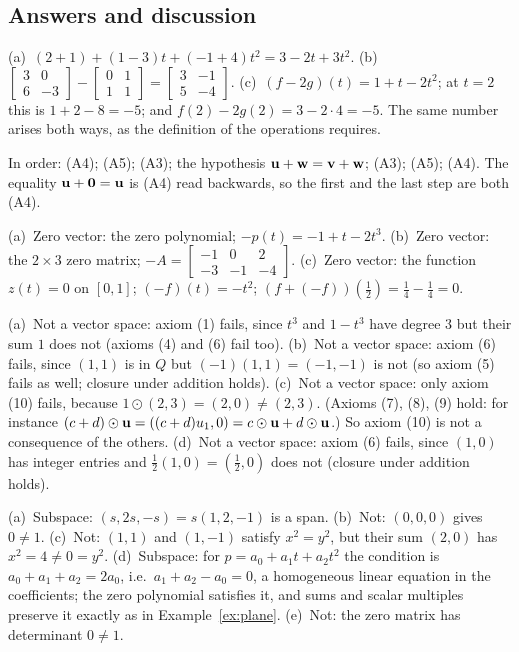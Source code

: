 \documentclass[11pt]{article}
\begin{document}
\subsection*{Answers and discussion}
\begin{description}[leftmargin=0pt,itemsep=5pt]
  \item[Knowledge Check \ref{kc:newworlds}.] (a)~$(2+1)+(1-3)t+(-1+4)t^2=3-2t+3t^2$. (b)~$\begin{bmatrix}3&0\\6&-3\end{bmatrix}-\begin{bmatrix}0&1\\1&1\end{bmatrix}=\begin{bmatrix}3&-1\\5&-4\end{bmatrix}$. (c)~$(f-2g)(t)=1+t-2t^2$; at $t=2$ this is $1+2-8=-5$; and $f(2)-2g(2)=3-2\cdot4=-5$. The same number arises both ways, as the definition of the operations requires.
  \item[Knowledge Check \ref{kc:axiomsteps}.] In order: (A4); (A5); (A3); the hypothesis $\mathbf{u}+\mathbf{w}=\mathbf{v}+\mathbf{w}$; (A3); (A5); (A4). The equality $\mathbf{u}+\mathbf{0}=\mathbf{u}$ is (A4) read backwards, so the first and the last step are both (A4).
  \item[Knowledge Check \ref{kc:zeroneg}.] (a)~Zero vector: the zero polynomial; $-p(t)=-1+t-2t^3$. (b)~Zero vector: the $2\times3$ zero matrix; $-A=\begin{bmatrix}-1&0&2\\-3&-1&-4\end{bmatrix}$. (c)~Zero vector: the function $z(t)=0$ on $[0,1]$; $(-f)(t)=-t^2$; $(f+(-f))(\tfrac12)=\tfrac14-\tfrac14=0$.
  \item[Knowledge Check \ref{kc:whichaxiom}.] (a)~Not a vector space: axiom (1) fails, since $t^3$ and $1-t^3$ have degree $3$ but their sum $1$ does not (axioms (4) and (6) fail too). (b)~Not a vector space: axiom (6) fails, since $(1,1)$ is in $Q$ but $(-1)(1,1)=(-1,-1)$ is not (so axiom (5) fails as well; closure under addition holds). (c)~Not a vector space: only axiom (10) fails, because $1\odot(2,3)=(2,0)\neq(2,3)$. (Axioms (7), (8), (9) hold: for instance $(c+d)\odot\mathbf{u}=((c+d)u_1,0)=c\odot\mathbf{u}+d\odot\mathbf{u}$.) So axiom (10) is not a consequence of the others. (d)~Not a vector space: axiom (6) fails, since $(1,0)$ has integer entries and $\tfrac12(1,0)=(\tfrac12,0)$ does not (closure under addition holds).
  \item[Knowledge Check \ref{kc:issub}.] (a)~Subspace: $(s,2s,-s)=s(1,2,-1)$ is a span. (b)~Not: $(0,0,0)$ gives $0\neq1$. (c)~Not: $(1,1)$ and $(1,-1)$ satisfy $x^2=y^2$, but their sum $(2,0)$ has $x^2=4\neq0=y^2$. (d)~Subspace: for $p=a_0+a_1t+a_2t^2$ the condition is $a_0+a_1+a_2=2a_0$, i.e.\ $a_1+a_2-a_0=0$, a homogeneous linear equation in the coefficients; the zero polynomial satisfies it, and sums and scalar multiples preserve it exactly as in Example~\ref{ex:plane}. (e)~Not: the zero matrix has determinant $0\neq1$.

\end{description}
\end{document}
